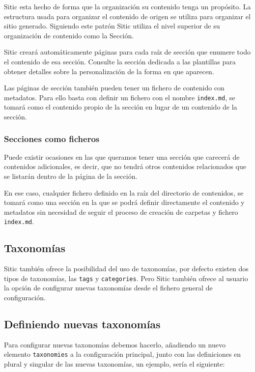 Sitic esta hecho de forma que la organización su contenido tenga un propósito. La estructura usada
para organizar el contenido de origen se utiliza para organizar el sitio generado. Siguiendo
este patrón Sitic utiliza el nivel superior de su organización de contenido como la Sección.

Sitic creará automáticamente páginas para cada raíz de sección que enumere todo el contenido
de esa sección. Consulte la sección dedicada a las plantillas para obtener detalles sobre
la personalización de la forma en que aparecen.

Las páginas de sección también pueden tener un fichero de contenido con metadatos. Para ello basta con
definir un fichero con el nombre \texttt{index.md}, se tomará como el contenido propio de la sección en
lugar de un contenido de la sección.

\subsubsection{Secciones como ficheros}

Puede existir ocasiones en las que queramos tener una sección que carecerá de contenidos adicionales,
es decir, que no tendrá otros contenidos relacionados que se listarán dentro de la página de la sección.

En ese caso, cualquier fichero definido en la raíz del directorio de contenidos, se tomará como una sección
en la que se podrá definir directamente el contenido y metadatos sin necesidad de seguir el proceso de creación
de carpetas y fichero \texttt{index.md}.

\subsection{Taxonomías}

Sitic también ofrece la posibilidad del uso de taxonomías, por defecto existen dos tipos de taxonomías,
las \texttt{tags} y \texttt{categories}. Pero Sitic también ofrece al usuario la opción de configurar
nuevas taxonomías desde el fichero general de configuración.

\subsection{Definiendo nuevas taxonomías}

Para configurar nuevas taxonomías debemos hacerlo, añadiendo un nuevo elemento \texttt{taxonomies}
a la configuración principal, junto
con las definiciones en plural y singular de las nuevas taxonomías, un ejemplo, sería el siguiente:

